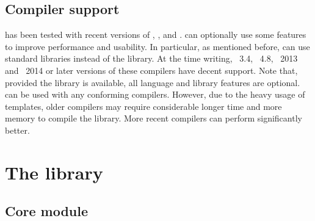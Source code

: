\documentclass[11pt, bib, hyper, mint, minted=cache]{marticle}
\begin{document}
\subsection{Compiler support}

\vsmc has been tested with recent versions of \fclang, \fgcc, \ficpc and
\fmsvc. \vsmc can optionally use some \cppoo features to improve performance
and usability. In particular, as mentioned before, \vsmc can use \cppoo
standard libraries instead of the \lboost library. At the time writing,
\lclang~3.4, \lgcc~4.8, \lmsvc~2013 and \licpc~2014 or later versions of these
compilers have decent \cppoo support. Note that, provided the \lboost library
is available, all \cppoo language and library features are optional.  \vsmc
can be used with any \cppne conforming compilers. However, due to the heavy
usage of templates, older compilers may require considerable longer time and
more memory to compile the library. More recent compilers can perform
significantly better.

\section[The vSMC library]{The \protect\vsmc library}
\label{sec:The vSMC library}

\subsection{Core module}
\label{sub:Core module}
\end{document}
